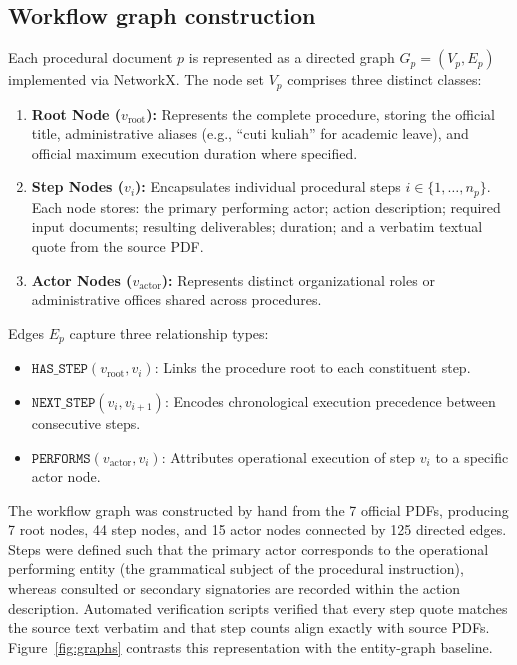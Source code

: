 \documentclass[preprint,10pt]{elsarticle}
\begin{document}
\subsection{Workflow graph construction}
\label{sec:graph}
Each procedural document $p$ is represented as a directed graph $G_p = (V_p, E_p)$ implemented via NetworkX. The node set $V_p$ comprises three distinct classes:
\begin{enumerate}[leftmargin=*]
\item \textbf{Root Node ($v_{\text{root}}$):} Represents the complete procedure, storing the official title, administrative aliases (e.g., ``cuti kuliah'' for academic leave), and official maximum execution duration where specified.
\item \textbf{Step Nodes ($v_i$):} Encapsulates individual procedural steps $i \in \{1, \dots, n_p\}$. Each node stores: the primary performing actor; action description; required input documents; resulting deliverables; duration; and a verbatim textual quote from the source PDF.
\item \textbf{Actor Nodes ($v_{\text{actor}}$):} Represents distinct organizational roles or administrative offices shared across procedures.
\end{enumerate}

Edges $E_p$ capture three relationship types:
\begin{itemize}[leftmargin=*]
\item $\texttt{HAS\_STEP}(v_{\text{root}}, v_i)$: Links the procedure root to each constituent step.
\item $\texttt{NEXT\_STEP}(v_i, v_{i+1})$: Encodes chronological execution precedence between consecutive steps.
\item $\texttt{PERFORMS}(v_{\text{actor}}, v_i)$: Attributes operational execution of step $v_i$ to a specific actor node.
\end{itemize}

The workflow graph was constructed by hand from the 7 official PDFs, producing 7 root nodes, 44 step nodes, and 15 actor nodes connected by 125 directed edges. Steps were defined such that the primary actor corresponds to the operational performing entity (the grammatical subject of the procedural instruction), whereas consulted or secondary signatories are recorded within the action description. Automated verification scripts verified that every step quote matches the source text verbatim and that step counts align exactly with source PDFs. Figure~\ref{fig:graphs} contrasts this representation with the entity-graph baseline.
\end{document}

